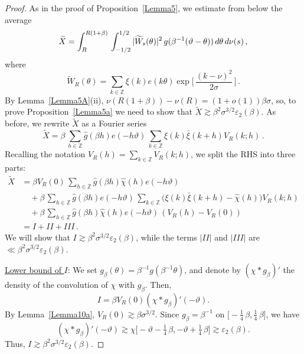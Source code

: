 \documentclass[10pt,a4paper]{amsart}
\newcommand{\bZ}{\mathbb Z}
\def\ep{{\varepsilon}}
\begin{document}
\begin{proof}
As in the proof of Proposition~\ref{Lemma5}, we estimate from below the average
\[
\widetilde{X} =
\int_R^{R(1+\beta)}\, \int_{-1/2}^{1/2} |\widetilde{W}_s(\theta)|^2\,
g(\beta^{-1}(\vartheta-\theta))\, {\rm d}\theta\, {\rm d}\nu (s)\,,
\]
where
\[
\widetilde{W}_R(\theta) = \sum_{k\in\bZ} \xi(k)e(k\theta)
\exp\bigl[\,\frac{(k-\nu)^2}{2\sigma} \,\bigr]\,.
\]
By Lemma~\ref{Lemma5A}(ii), $\nu(R(1+\beta))-\nu(R) = (1+o(1))\beta\sigma$, so, to prove Proposition~\ref{Lemma5a} we need to show that
$\widetilde{X} \gtrsim \beta^2\sigma^{3/2}\ep_2(\beta)$.
As before, we rewrite $\widetilde X$ as a Fourier series
\[
\widetilde{X}
= \beta\,
\sum_{h\in\bZ} \widehat{g}(\beta h) e(-h\vartheta)\,
\sum_{k\in\bZ} \xi(k)\bar\xi(k+h) V_R(k; h)\,.
\]
Recalling the notation
$\displaystyle V_R(h) = \sum_{k\in\bZ} V_R(k; h)$, we split the RHS into three parts:
\begin{align*}
\widetilde{X}  &= \beta V_R(0)\, \sum_{h\in\bZ} \widehat{g}(\beta h)\widehat{\chi}(h) e(-h\vartheta) \\
&\quad + \beta\, \sum_{h\in\bZ} \widehat{g}(\beta h) e(-h\vartheta)\,
\sum_{k\in\bZ} \bigl( \xi(k)\bar\xi(k+h) - \widehat{\chi}(h) \bigr) V_R(k; h) \\
&\quad + \beta\, \sum_{h\in\bZ} \widehat{g}(\beta h) \widehat{\chi}(h) e(-h\vartheta)\,
(V_R(h) - V_R(0)) \\
&= I +II + III\,.
\end{align*}
We will show that $I\gtrsim \beta^2\sigma^{3/2}\ep_2(\beta)$, while
the terms $|II|$ and $|III|$ are  $\ll \beta^2\sigma^{3/2}\ep_2(\beta)$.

\medskip\noindent\underline{Lower bound of $I$}:
We set $g_\beta(\theta) = \beta^{-1}g(\beta^{-1}\theta)$, and denote by
$(\chi * g_\beta)'$ the density of the convolution of $\chi$ with
$g_\beta$. Then, \[ I=\beta V_R(0) (\chi * g_\beta)'(-\vartheta).\]
By Lemma~\ref{Lemma10a}, $V_R(0)\gtrsim \beta \sigma^{3/2}$. Since $g_\beta = \beta^{-1}$ on
$ \bigl[-\tfrac14\, \beta, \tfrac14\, \beta \bigr]$, we have
\[
(\chi * g_\beta)'(-\vartheta) \gtrsim
\chi\bigl[-\vartheta-\tfrac14\, \beta, -\vartheta + \tfrac14\, \beta \bigr]
\gtrsim \ep_2(\beta).
\]
Thus, $I \gtrsim \beta^2 \sigma^{3/2} \ep_2(\beta)$.


\end{proof}
\end{document}
